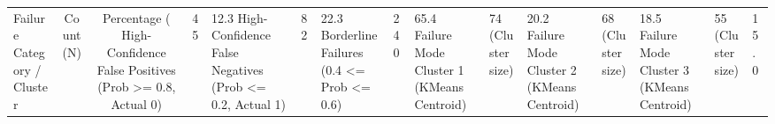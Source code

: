 \begin{tabular}{lccc}
\toprule
Failure Category / Cluster & Count (N) & Percentage (%
\midrule
High-Confidence False Positives (Prob >= 0.8, Actual 0) & 45 & 12.3%
High-Confidence False Negatives (Prob <= 0.2, Actual 1) & 82 & 22.3%
Borderline Failures (0.4 <= Prob <= 0.6) & 240 & 65.4%
Failure Mode Cluster 1 (KMeans Centroid) & 74 (Cluster size) & 20.2%
Failure Mode Cluster 2 (KMeans Centroid) & 68 (Cluster size) & 18.5%
Failure Mode Cluster 3 (KMeans Centroid) & 55 (Cluster size) & 15.0%
\bottomrule
\end{tabular}
